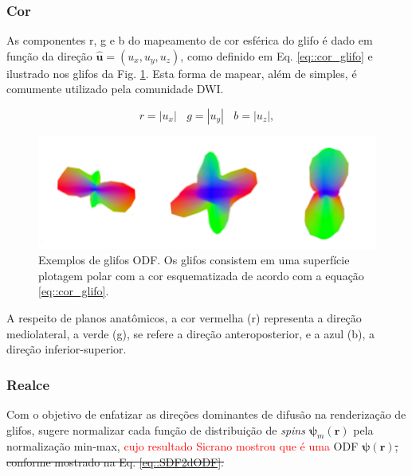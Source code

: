 \documentclass[
    12pt,                %
    oneside,            %
    a4paper,            %
    english,            %
    french,                %
    spanish,            %
    brazil                %
    ]{abntex2}
\begin{document}
\subsubsection{Cor}

As componentes r, g e b do mapeamento de cor esférica do glifo é dado em função da direção $\mathbf{\hat{u}} = (u_x, u_y, u_z)$, como definido em Eq. \ref{eq::cor_glifo} e ilustrado nos glifos da Fig. \ref{fig::glifo_ilustrado}. Esta forma de mapear, além de simples, é comumente utilizado pela comunidade DWI. %

\begin{equation}
\label{eq::cor_glifo}
    r = |u_x| ~~~~ g = |u_y| ~~~~ b = |u_z|, 
\end{equation}

\begin{figure}[ht]

    \centering
    \includegraphics[width=.8\linewidth, angle=0]{figs/Esquema_Glifo/Glifos3Ex.png}
    \caption{Exemplos de glifos ODF. Os glifos consistem em uma superfície plotagem polar com a cor esquematizada de acordo com a equação \ref{eq::cor_glifo}.}
    \label{fig::glifo_ilustrado}
   \hspace{1pt}
\end{figure}

A respeito de planos anatômicos, a cor vermelha (r) representa a direção mediolateral, a verde (g), se refere a direção anteroposterior, e a azul (b), a direção inferior-superior.

\subsubsection{Realce}

Com o objetivo de enfatizar as direções dominantes de difusão na renderização de glifos,  sugere normalizar cada função de distribuição de \textit{spins} $\boldsymbol{\psi}_m(\mathbf{r})$ pela normalização min-max, \textcolor{red}{cujo resultado Sicrano \cite{???} mostrou que é uma} ODF $\boldsymbol{\psi}(\mathbf{r})$\sout{, conforme mostrado na Eq. \ref{eq::SDF2dODF}.} 
\end{document}

